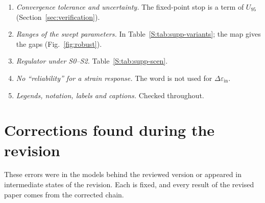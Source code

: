 \documentclass[10pt]{article}
\newcommand{\deps}{\Delta\varepsilon_{\mathrm{in}}}
\begin{document}
\begin{enumerate}
post-processing (Section~\ref{sec:verification}, Table~\ref{S:tab:supp-mesh}).
\item \emph{Convergence tolerance and uncertainty.} The fixed-point stop is a term of $U_{95}$
(Section~\ref{sec:verification}).
\item \emph{Ranges of the swept parameters.} In Table~\ref{S:tab:supp-variants}; the map gives the
gaps (Fig.~\ref{fig:robust}).
\item \emph{Regulator under S0--S2.} Table~\ref{S:tab:supp-scen}.
\item \emph{No ``reliability'' for a strain response.} The word is not used for $\deps$.
\item \emph{Legends, notation, labels and captions.} Checked throughout.
\end{enumerate}

\section*{Corrections found during the revision}
These errors were in the models behind the reviewed version or appeared in intermediate states of the
revision. Each is fixed, and every result of the revised paper comes from the corrected chain.
\end{document}
